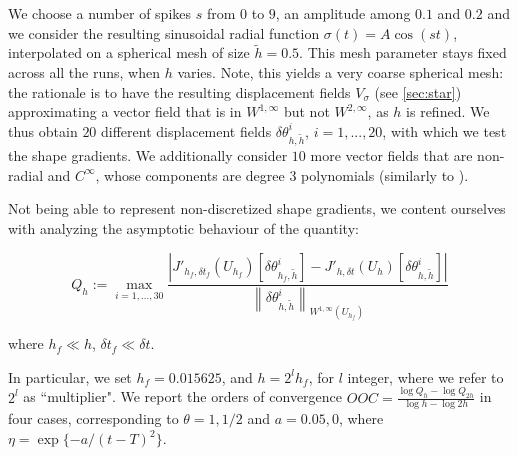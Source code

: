 \documentclass[english,a4paper,9pt,oneside]{scrbook}	%
\theoremstyle{break}
\theoremstyle{remark}
\newcommand{\ds}{\displaystyle}
\newcommand{\norm}[1]{\left\lVert#1\right\rVert}
\newcommand{\te}{\theta}
\begin{document}
We choose a number of spikes $s$ from $0$ to $9$, an amplitude among $0.1$ and $0.2$ and we consider the resulting sinusoidal radial function $\sigma(t) = A \cos(st)$, interpolated on a spherical mesh of size $\tilde{h} = 0.5$. This mesh parameter stays fixed across all the runs, when $h$ varies. Note, this yields a very coarse spherical mesh: the rationale is to have the resulting displacement fields $V_\sigma$ (see \cref{sec:star}) approximating a vector field that is in $W^{1,\infty}$ but not $W^{2,\infty}$, as $h$ is refined. We thus obtain  $20$ different displacement fields $\delta \te_{h,\tilde{h}}^i$, $i=1,...,20$, with which we test the shape gradients.  We additionally consider $10$ more vector fields that are non-radial and $C^\infty$, whose components are degree $3$ polynomials (similarly to \cite{paganini}). 


Not being able to represent non-discretized shape gradients, we content ourselves with analyzing the asymptotic behaviour of the quantity:

$$Q_h:=\max_{i=1,...,30}\frac{|J'_{h_f,\delta t_f}(U_{h_f})[\delta \te_{h_f,\tilde{h}}^i]-J'_{h,\delta t}(U_h)[\delta \te_{h,\tilde{h}}^i]|}{\norm{\delta \te_{h,\tilde{h}}^i}_{W^{1,\infty}(U_{h_f})}}$$

where $h_f \ll h$, $\delta t_f \ll \delta t$.

In particular, we set $h_f = 0.015625$, and $h = 2^{l} h_f$, for $l$ integer, where we refer to $2^l$ as ``multiplier". We report the orders of convergence $\ds OOC =  \frac{\log Q_h-\log Q_{2h}}{\log h - \log 2h}$ in four cases, corresponding to $\theta =1, 1/2$ and $a = 0.05, 0$, where $\eta =\exp\{-a/(t-T)^2\} $.
%
\end{document}
